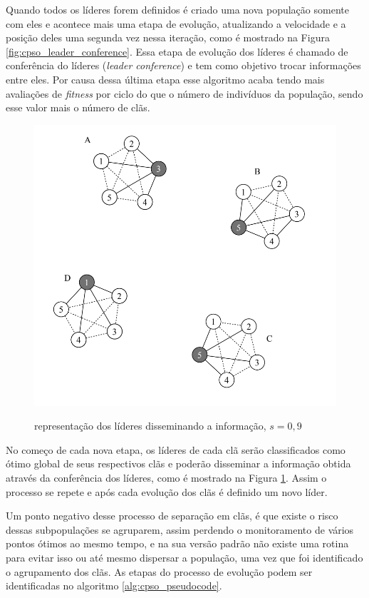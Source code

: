 Quando todos os líderes forem definidos é criado uma nova população somente com eles e acontece mais uma etapa de evolução, atualizando a velocidade e a posição deles uma segunda vez nessa iteração, como é mostrado na Figura \ref{fig:cpso_leader_conference}. Essa etapa de evolução dos líderes é chamado de conferência do líderes (\textit{leader conference}) e tem como objetivo trocar informações entre eles. Por causa dessa última etapa esse algoritmo acaba tendo mais avaliações de \textit{fitness} por ciclo do que o número de indivíduos da população, sendo esse valor mais o número de clãs.

\begin{figure}[!htb]
	\caption{representação dos líderes disseminando a informação, $ s = 0,9 $}
	\centering
	\includegraphics[scale=0.6]{images/cpso_information_sharing.png}
	\label{fig:cpso_information_sharing}
\end{figure}

No começo de cada nova etapa, os líderes de cada clã serão classificados como ótimo global de seus respectivos clãs e poderão disseminar a informação obtida através da conferência dos líderes, como é mostrado na Figura \ref{fig:cpso_information_sharing}. Assim o processo se repete e após cada evolução dos clãs é definido um novo líder.

Um ponto negativo desse processo de separação em clãs, é que existe o risco dessas subpopulações se agruparem, assim perdendo o monitoramento de vários pontos ótimos ao mesmo tempo, e na sua versão padrão não existe uma rotina para evitar isso ou até mesmo dispersar a população, uma vez que foi identificado o agrupamento dos clãs. As etapas do processo de evolução podem ser identificadas no algoritmo \ref{alg:cpso_pseudocode}.

